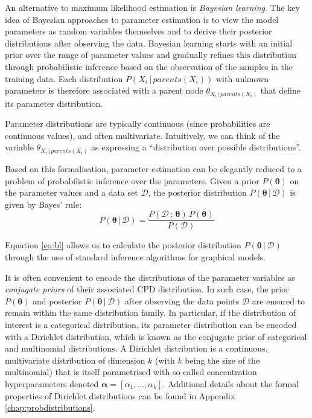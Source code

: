 An alternative to maximum likelihood estimation is \textit{Bayesian learning}.  The key idea of Bayesian approaches to parameter estimation is to view the model parameters as random variables themselves and to derive their posterior distributions after observing the data.  Bayesian learning starts with an initial prior over the range of parameter values and gradually refines this distribution through probabilistic inference based on the observation of the samples in the training data. Each distribution $P(X_i \, | \, \mathit{parents}(X_i))$ with unknown parameters is therefore associated with a parent node $\theta_{X_i\, | \, \mathit{parents}(X_i)}$ that define its parameter distribution.  

Parameter distributions are typically continuous (since probabilities are continuous values), and often multivariate.  Intuitively, we can think of the variable $\theta_{X_i \, | \, \mathit{parents}(X_i)}$ as expressing a ``distribution over possible distributions''.  

Based on this formalisation, parameter estimation can be elegantly reduced to a problem of probabilistic inference over the parameters. Given a prior $P(\boldsymbol\theta)$ on the parameter values and a data set $\mathcal{D}$, the posterior distribution $P(\boldsymbol\theta  \, | \, \mathcal{D})$ is given by Bayes' rule: 
\begin{equation}
P(\boldsymbol\theta  \, | \, \mathcal{D}) =  \frac{P(\mathcal{D} \, ; \, \boldsymbol\theta) \, P(\boldsymbol\theta)}{P(\mathcal{D})} \label{eq:bl}
\end{equation}


Equation \eqref{eq:bl} allows us to calculate the posterior distribution $P(\boldsymbol\theta  \, | \, \mathcal{D})$ through the use of standard inference algorithms for graphical models. 

It is often convenient to encode the distributions of the parameter variables as \textit{conjugate priors} of their associated CPD distribution. In such case, the prior $P(\boldsymbol\theta)$ and posterior $P(\boldsymbol\theta  \, | \, \mathcal{D})$ after observing the data points $\mathcal{D}$ are ensured to remain within the same distribution family. In particular, if the distribution of interest is a categorical distribution, its parameter distribution can be encoded with a Dirichlet distribution, which is known as the conjugate prior of categorical and multinomial distributions. A Dirichlet distribution is a continuous, multivariate distribution of dimension $k$ (with $k$ being the size of the multinomial) that is itself parametrised with so-called concentration hyperparameters denoted $\boldsymbol\alpha = [ \alpha_1, \dots, \alpha_k ]$. Additional details about the formal properties of Dirichlet distributions can be found in Appendix \ref{chap:probdistributions}.

